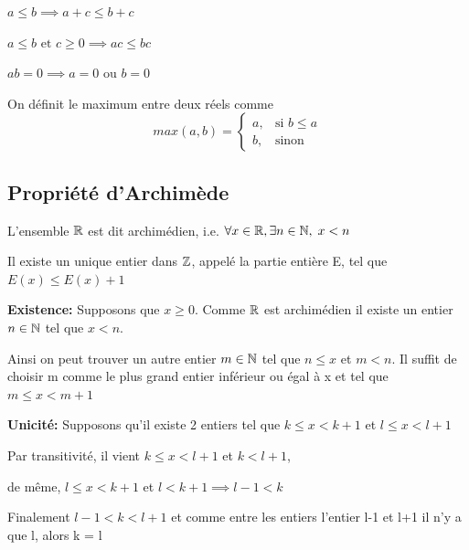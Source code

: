 \documentclass[a4paper, 12pt]{article}
\begin{document}
\begin{proprietes}
    \item $a \leq b \implies a + c \leq b + c$
    \item $a \leq b \text{ et } c \geq 0 \implies ac \leq bc$
    \item $ab = 0 \implies a = 0 \text{ ou } b = 0$
\end{proprietes}

On définit le maximum entre deux réels comme
\begin{equation*}
    max(a, b) =
    \begin{cases}
        a, & \text{si } b \leq a \\
        b, & \text{sinon}
    \end{cases}
\end{equation*}




\subsection{Propriété d'Archimède}

L'ensemble $\mathbb{R}$ est dit archimédien, i.e. $\forall x \in \mathbb{R}, \exists n \in \mathbb{N}, \; x < n$

\begin{proposition}
    Il existe un unique entier dans $\mathbb{Z}$, appelé la partie entière E, tel que $E(x) \leq E(x) + 1$
\end{proposition}

\begin{demonstration}
    \textbf{Existence:} Supposons que $x \geq 0$.
    Comme $\mathbb{R}$ est archimédien il existe un entier $n \in \mathbb{N}$ tel que $x \lt n$.

    \begin{rdem}
        Ainsi on peut trouver un autre entier $m \in \mathbb{N}$ tel que $n \leq x$ et $m \lt n$.
        Il suffit de choisir m comme le plus grand entier inférieur ou égal à x et tel que $m \leq x \lt m + 1$
    \end{rdem}

    \vspace{1em}

    \noindent
    \textbf{Unicité:} Supposons qu'il existe 2 entiers tel que $k \leq x \lt k + 1$ et $l \leq x \lt l + 1$

    Par transitivité, il vient $k \leq x \lt l + 1$ et $k \lt l + 1$,

    de même, $l \leq x \lt k + 1$ et $l \lt k + 1 \implies l - 1 \lt k$

    \begin{rdem}
        Finalement $l - 1 \lt k \lt l + 1$ et comme entre les entiers l'entier l-1 et l+1 il n'y a que l, alors k = l
    \end{rdem}
\end{demonstration}
\end{document}
